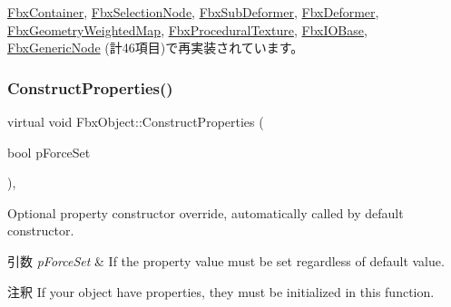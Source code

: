 \hyperlink{class_fbx_container_a65204439a64fd2184467e41d994bec0a}{Fbx\+Container}, \hyperlink{class_fbx_selection_node_aaef80cf95a8109fe5cc6263f18d7cb99}{Fbx\+Selection\+Node}, \hyperlink{class_fbx_sub_deformer_ae3d566383651e82b681827f0f38b97f3}{Fbx\+Sub\+Deformer}, \hyperlink{class_fbx_deformer_ac50e8e0e8cfd2934f8f8cca2d69a6f58}{Fbx\+Deformer}, \hyperlink{class_fbx_geometry_weighted_map_af8485ac8574bf4ac9222de920a98e81f}{Fbx\+Geometry\+Weighted\+Map}, \hyperlink{class_fbx_procedural_texture_a2386483aef2766c16c911e6fd6539d32}{Fbx\+Procedural\+Texture}, \hyperlink{class_fbx_i_o_base_aed70ed1326f8fb1cc96e2086c73722f8}{Fbx\+I\+O\+Base}, \hyperlink{class_fbx_generic_node_a63ff7b8adb2ddc1803f74b9afce50fc2}{Fbx\+Generic\+Node} (計46項目)で再実装されています。

\mbox{\label{class_fbx_object_ad44f814323dc1b5e78bff1bfc608b4bb}} 
\subsubsection{\texorpdfstring{Construct\+Properties()}{ConstructProperties()}}
{\footnotesize\ttfamily virtual void Fbx\+Object\+::\+Construct\+Properties (\begin{DoxyParamCaption}\item[{bool}]{p\+Force\+Set }\end{DoxyParamCaption})\hspace{0.3cm}{\ttfamily [protected]}, {\ttfamily [virtual]}}

Optional property constructor override, automatically called by default constructor. 
\begin{DoxyParams}{引数}
{\em p\+Force\+Set} & If the property value must be set regardless of default value. \\
\hline
\end{DoxyParams}
\begin{DoxyRemark}{注釈}
If your object have properties, they must be initialized in this function. 
\end{DoxyRemark}


